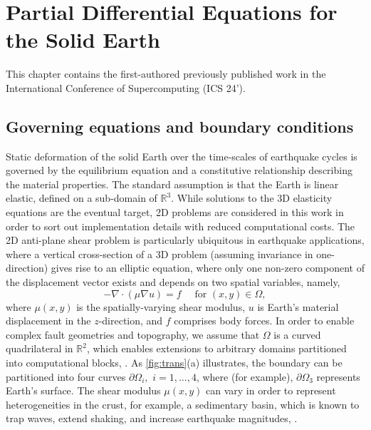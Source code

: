 \section{Partial Differential Equations for the Solid Earth}
This chapter contains the first-authored previously published work in the International Conference of Supercomputing (ICS 24').
\subsection{Governing equations and boundary conditions}
Static deformation of the solid Earth over the time-scales of earthquake cycles is governed by the equilibrium equation and a constitutive relationship describing the material properties.  The standard assumption is that the Earth is linear elastic, defined on a sub-domain of $\mathbb{R}^3$.  While solutions to the 3D elasticity equations are the eventual target, 2D problems are considered in this work in order to sort out implementation details with reduced computational costs.  The 2D anti-plane shear problem \citep{antiplaneshear} is particularly ubiquitous in earthquake applications, where a vertical cross-section of a 3D problem (assuming invariance in one-direction) gives rise to an elliptic equation, where only one non-zero component of the displacement vector exists and depends on two spatial variables, namely,
\begin{equation}
    -\nabla \cdot \left({\mu} \nabla u\right) = f \quad \text{ for } (x, y) \in \Omega, 
    \label{eqn: 2D}
\end{equation}
where ${\mu}(x, y)$ is the spatially-varying shear modulus, $u$ is Earth's material displacement in the $z$-direction, and $f$ comprises body forces. In order to enable complex fault geometries and topography, we assume that $\Omega$ is a curved quadrilateral in $\mathbb{R}^2$, which enables extensions to arbitrary domains partitioned into computational blocks, \citep[e.g.][]{Kozdon2020HybridizedSF}. As \autoref{fig:trans}(a) illustrates, the boundary can be partitioned into four curves $\partial\Omega_i, \,\, i = 1, ..., 4$, where (for example), $\partial \Omega_3$ represents Earth's surface. The shear modulus $\mu(x, y)$ can vary in order to represent heterogeneities in the crust, for example, a sedimentary basin, which is known to trap waves, extend shaking, and increase earthquake magnitudes, \citep[e.g.][]{Boue2016}. 

